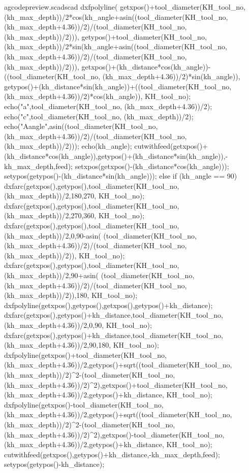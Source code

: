 \documentclass{ltxdoc}
\begin{document}
\begin{writecode}{a}{gcodepreview.scad}{scad}
{dxfpolyline( getxpos()+tool_diameter(KH_tool_no, (kh_max_depth))/2*cos(kh_angle+asin((tool_diameter(KH_tool_no, (kh_max_depth+4.36))/2)/(tool_diameter(KH_tool_no, (kh_max_depth))/2))),
 getypos()+tool_diameter(KH_tool_no, (kh_max_depth))/2*sin(kh_angle+asin((tool_diameter(KH_tool_no, (kh_max_depth+4.36))/2)/(tool_diameter(KH_tool_no, (kh_max_depth))/2))),
 getxpos()+(kh_distance*cos(kh_angle))-((tool_diameter(KH_tool_no, (kh_max_depth+4.36))/2)*sin(kh_angle)),
 getypos()+(kh_distance*sin(kh_angle))+((tool_diameter(KH_tool_no, (kh_max_depth+4.36))/2)*cos(kh_angle)), KH_tool_no);
echo("a",tool_diameter(KH_tool_no, (kh_max_depth+4.36))/2);
echo("c",tool_diameter(KH_tool_no, (kh_max_depth))/2);
echo("Aangle",asin((tool_diameter(KH_tool_no, (kh_max_depth+4.36))/2)/(tool_diameter(KH_tool_no, (kh_max_depth))/2)));
echo(kh_angle);
 cutwithfeed(getxpos()+(kh_distance*cos(kh_angle)),getypos()+(kh_distance*sin(kh_angle)),-kh_max_depth,feed);
 setxpos(getxpos()-(kh_distance*cos(kh_angle)));
 setypos(getypos()-(kh_distance*sin(kh_angle)));
  } else if (kh_angle == 90) {
dxfarc(getxpos(),getypos(),tool_diameter(KH_tool_no, (kh_max_depth))/2,180,270, KH_tool_no);
dxfarc(getxpos(),getypos(),tool_diameter(KH_tool_no, (kh_max_depth))/2,270,360, KH_tool_no);
dxfarc(getxpos(),getypos(),tool_diameter(KH_tool_no, (kh_max_depth))/2,0,90-asin(
    (tool_diameter(KH_tool_no, (kh_max_depth+4.36))/2)/(tool_diameter(KH_tool_no, (kh_max_depth))/2)), KH_tool_no);
dxfarc(getxpos(),getypos(),tool_diameter(KH_tool_no, (kh_max_depth))/2,90+asin(
    (tool_diameter(KH_tool_no, (kh_max_depth+4.36))/2)/(tool_diameter(KH_tool_no, (kh_max_depth))/2)),180, KH_tool_no);
 dxfpolyline(getxpos(),getypos(),getxpos(),getypos()+kh_distance);
dxfarc(getxpos(),getypos()+kh_distance,tool_diameter(KH_tool_no, (kh_max_depth+4.36))/2,0,90, KH_tool_no);
dxfarc(getxpos(),getypos()+kh_distance,tool_diameter(KH_tool_no, (kh_max_depth+4.36))/2,90,180, KH_tool_no);
 dxfpolyline(getxpos()+tool_diameter(KH_tool_no, (kh_max_depth+4.36))/2,getypos()+sqrt((tool_diameter(KH_tool_no, (kh_max_depth))/2)^2-(tool_diameter(KH_tool_no, (kh_max_depth+4.36))/2)^2),getxpos()+tool_diameter(KH_tool_no, (kh_max_depth+4.36))/2,getypos()+kh_distance, KH_tool_no);
 dxfpolyline(getxpos()-tool_diameter(KH_tool_no, (kh_max_depth+4.36))/2,getypos()+sqrt((tool_diameter(KH_tool_no, (kh_max_depth))/2)^2-(tool_diameter(KH_tool_no, (kh_max_depth+4.36))/2)^2),getxpos()-tool_diameter(KH_tool_no, (kh_max_depth+4.36))/2,getypos()+kh_distance, KH_tool_no);
 cutwithfeed(getxpos(),getypos()+kh_distance,-kh_max_depth,feed);
 setypos(getypos()-kh_distance);
}
\end{writecode}
\end{document}
